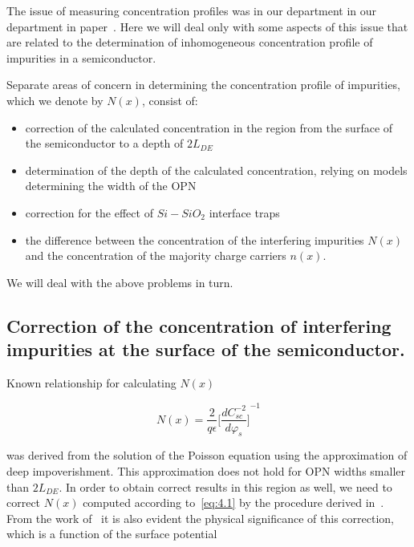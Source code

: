 The issue of measuring concentration profiles was in our department in
our department in paper~\cite{4.6}. Here we will deal only with some
aspects of this issue that are related to the determination of
inhomogeneous concentration profile of impurities in a semiconductor.

\par Separate areas of concern in determining the concentration
profile of impurities, which we denote by $N(x)$, consist of:

\begin{itemize}
\item correction of the calculated concentration in the region from
  the surface of the semiconductor to a depth of $2L_{DE}$~\cite{4.7,
    4.8}
\item determination of the depth of the calculated concentration,
  relying on models determining the width of the OPN~\cite{4.9, 4.10,
    4.11}
\item correction for the effect of $Si-SiO_2$ interface
  traps~\cite{4.12}
\item the difference between the concentration of the interfering
  impurities $N(x)$ and the concentration of the majority charge
  carriers $n(x)$.
\end{itemize}

We will deal with the above problems in turn.

\subsection[Correction of the concentration of interfering impurities]{Correction of the concentration of interfering impurities at the surface of the semiconductor.}\label{sec:4.1.1}

Known relationship for calculating $N(x)$~\cite{I.2}

\begin{equation}\label{eq:4.1}
  N(x) = {\frac{2}{q\epsilon}} {\Bigg[\frac{dC_{sc}^{-2}}{d\varphi_{s}}\Bigg]}^{-1}
\end{equation}

was derived from the solution of the Poisson equation using the
approximation of deep impoverishment. This approximation does not hold
for OPN widths smaller than $2L_{DE}$.  In order to obtain correct
results in this region as well, we need to correct $N(x)$ computed
according to~\ref{eq:4.1} by the procedure derived in~\cite{4.7, 4.8}.
From the work of~\cite{4.7} it is also evident the physical
significance of this correction, which is a function of the surface
potential


